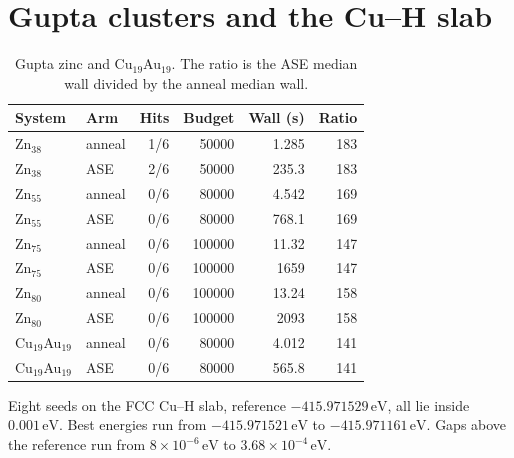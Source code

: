 \documentclass[aip,jcp,preprint,amsmath,amssymb]{revtex4-2}
\begin{document}
\section{Gupta clusters and the Cu--H slab}
\begin{table}
\caption{Gupta zinc and Cu\(_{19}\)Au\(_{19}\).
The ratio is the ASE median wall divided by the anneal median wall.}
\begin{ruledtabular}
\begin{tabular}{llrrrr}
System & Arm & Hits & Budget & Wall (s) & Ratio \\
\hline
Zn\(_{38}\) & anneal & 1/6 & 50000 & 1.285 & 183 \\
Zn\(_{38}\) & ASE & 2/6 & 50000 & 235.3 & 183 \\
Zn\(_{55}\) & anneal & 0/6 & 80000 & 4.542 & 169 \\
Zn\(_{55}\) & ASE & 0/6 & 80000 & 768.1 & 169 \\
Zn\(_{75}\) & anneal & 0/6 & 100000 & 11.32 & 147 \\
Zn\(_{75}\) & ASE & 0/6 & 100000 & 1659 & 147 \\
Zn\(_{80}\) & anneal & 0/6 & 100000 & 13.24 & 158 \\
Zn\(_{80}\) & ASE & 0/6 & 100000 & 2093 & 158 \\
Cu\(_{19}\)Au\(_{19}\) & anneal & 0/6 & 80000 & 4.012 & 141 \\
Cu\(_{19}\)Au\(_{19}\) & ASE & 0/6 & 80000 & 565.8 & 141 \\
\end{tabular}
\end{ruledtabular}
\end{table}

Eight seeds on the FCC Cu--H slab, reference \(-415.971529\,\mathrm{eV}\), all lie inside \(0.001\,\mathrm{eV}\).
Best energies run from \(-415.971521\,\mathrm{eV}\) to \(-415.971161\,\mathrm{eV}\).
Gaps above the reference run from \(8\times 10^{-6}\,\mathrm{eV}\) to \(3.68\times 10^{-4}\,\mathrm{eV}\).
\end{document}
